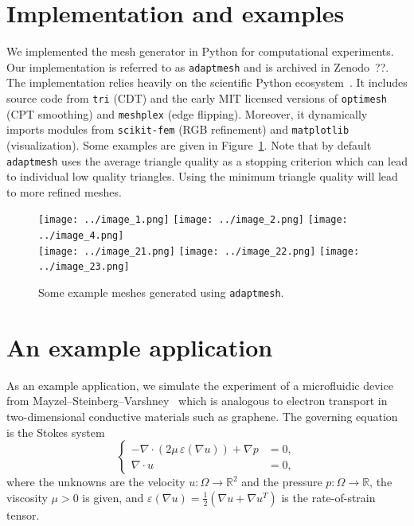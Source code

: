 \documentclass[11pt]{article}
\begin{document}
\section{Implementation and examples}

We implemented the mesh generator in Python for computational experiments.  Our
implementation is referred to as \verb|adaptmesh| and is archived in Zenodo~??.
The implementation relies heavily on the scientific Python
ecosystem~\cite{virtanen2020scipy}.  It includes source code from \verb|tri|
\cite{tri} (CDT) and the early MIT licensed versions of \verb|optimesh|
\cite{optimesh} (CPT smoothing) and \verb|meshplex| \cite{meshplex} (edge
flipping).  Moreover, it dynamically imports modules from \verb|scikit-fem|
\cite{gustafsson2020scikit} (RGB refinement) and \verb|matplotlib|
\cite{hunter2007matplotlib} (visualization).  Some examples are given in
Figure~\ref{fig:moreexamples}.  Note that by default \verb|adaptmesh| uses the
average triangle quality as a stopping criterion which can lead to individual
low quality triangles.  Using the minimum triangle quality will lead to more
refined meshes.

\begin{figure}[htbp]
  \centering
  \texttt{[image: ../image\_1.png]}
  \texttt{[image: ../image\_2.png]}
  \texttt{[image: ../image\_4.png]}\\
  \texttt{[image: ../image\_21.png]}
  \texttt{[image: ../image\_22.png]}
  \texttt{[image: ../image\_23.png]}
  \caption{Some example meshes generated using \texttt{adaptmesh}.}
\label{fig:moreexamples}
\end{figure}

\section{An example application}

As an example application, we simulate the experiment of a
microfluidic device from
Mayzel--Steinberg--Varshney~\cite{mayzel2019stokes}
which is analogous to electron transport in two-dimensional
conductive materials such as graphene.
The governing equation is the Stokes system
\begin{equation}
  \left\{
  \begin{aligned}
    -\nabla \cdot (2\mu\,\varepsilon(\nabla u)) + \nabla p &= 0, \\
    \nabla \cdot u &= 0,
  \end{aligned}
  \right.
\end{equation}
where the unknowns are the velocity $u : \Omega \rightarrow \mathbb{R}^2$ and
the pressure $p : \Omega \rightarrow \mathbb{R}$, the viscosity $\mu > 0$ is
given, and $\varepsilon(\nabla u) = \tfrac12(\nabla u + \nabla u^T)$ is the
rate-of-strain tensor.
\end{document}
